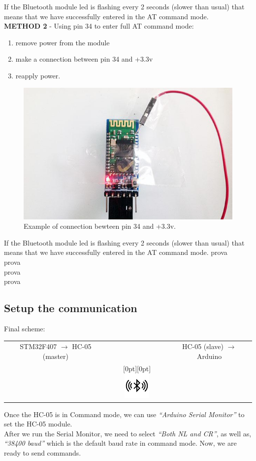 If the Bluetooth module led is flashing every 2 seconds (slower than usual) that means that we have successfully entered in the AT command mode.\\
\textbf{METHOD 2} - Using pin 34 to enter full AT command mode:
\begin{enumerate}
	\item remove power from the module
	\item make a connection between pin 34 and +3.3v
	\item reapply power.
\end{enumerate}
\begin{figure}[H]
	\centering
	\includegraphics[width=\textwidth]
	{files/images/hc05_pin34}
	\caption{Example of connection bewteen pin 34 and +3.3v.}
\end{figure}
If the Bluetooth module led is flashing every 2 seconds (slower than usual) that means that we have successfully entered in the AT command mode.
prova\\
prova\\
prova\\
prova\\

\subsection{Setup the communication}
Final scheme:\\

\begin{tabular}{c c c}
STM32F407  $\rightarrow$ HC-05 (master)&  & HC-05 (slave) $\rightarrow$ Arduino \\
 & \raisebox{0pt}[0pt][0pt]{
	\includegraphics{files/images/bluetooth_logo_resize} }
 & \\
\end{tabular}
Once the HC-05 is in Command mode, we can use \textit{“Arduino Serial Monitor”} to set the HC-05 module.\\
After we run the Serial Monitor, we need to select \textit{“Both NL and CR”}, as well as, \textit{“38400 baud”} which is the default baud rate in command mode. Now, we are ready to send commands.\\

